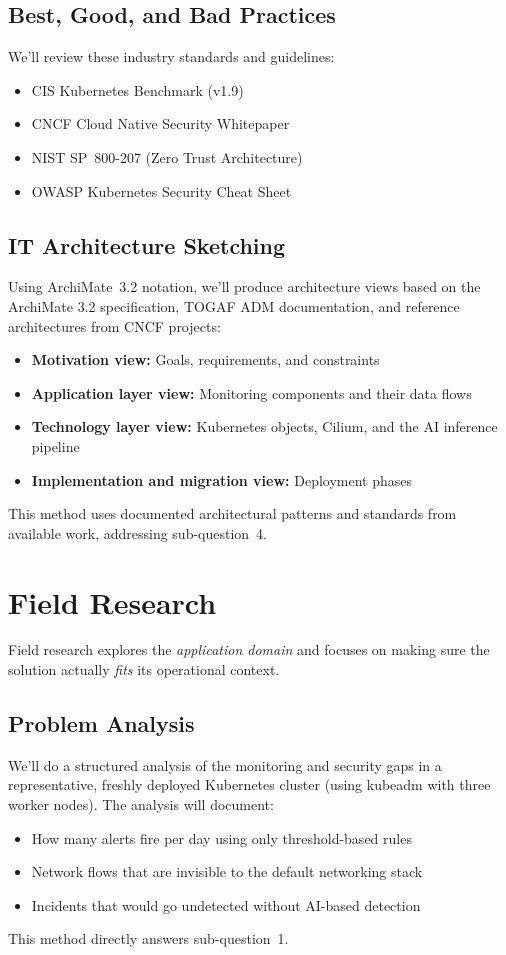 \subsection{Best, Good, and Bad Practices}
We'll review these industry standards and guidelines:
\begin{itemize}
    \item CIS Kubernetes Benchmark (v1.9)
    \item CNCF Cloud Native Security Whitepaper
    \item NIST SP~800-207 (Zero Trust Architecture)
    \item OWASP Kubernetes Security Cheat Sheet
\end{itemize}

\subsection{IT Architecture Sketching}
Using ArchiMate~3.2 notation, we'll produce architecture views based on the ArchiMate 3.2 specification, TOGAF ADM documentation, and reference architectures from CNCF projects:
\begin{itemize}
    \item \textbf{Motivation view:} Goals, requirements, and constraints
    \item \textbf{Application layer view:} Monitoring components and their data flows
    \item \textbf{Technology layer view:} Kubernetes objects, Cilium, and the AI inference pipeline
    \item \textbf{Implementation and migration view:} Deployment phases
\end{itemize}
This method uses documented architectural patterns and standards from available work, addressing sub-question~4.

\section{Field Research}

Field research explores the \emph{application domain} and focuses on making sure the solution actually \emph{fits} its operational context.

\subsection{Problem Analysis}
We'll do a structured analysis of the monitoring and security gaps in a representative, freshly deployed Kubernetes cluster (using kubeadm with three worker nodes). The analysis will document:
\begin{itemize}
    \item How many alerts fire per day using only threshold-based rules
    \item Network flows that are invisible to the default networking stack
    \item Incidents that would go undetected without AI-based detection
\end{itemize}
This method directly answers sub-question~1.

